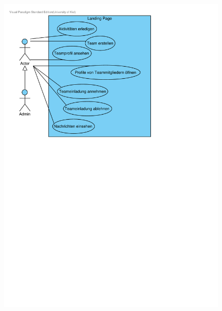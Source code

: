 \documentclass[10pt,a4paper]{article}
\begin{document}
		\begin{figure}[h]
			\includegraphics[width=\linewidth]{gfx/webseite/LandingPage.pdf}
		\end{figure}
\end{document}
